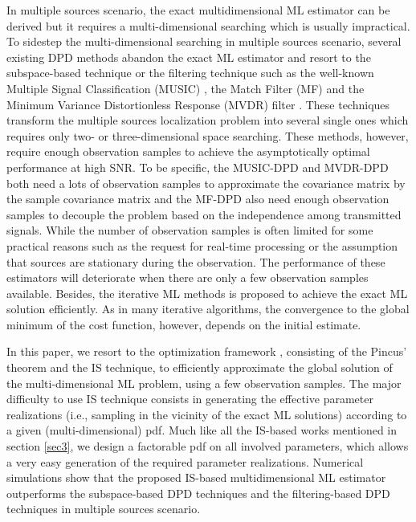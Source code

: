 \documentclass[review]{elsarticle}
\begin{document}
In multiple sources scenario, the exact multidimensional ML estimator can be derived but it requires a multi-dimensional searching which is usually impractical. To sidestep the multi-dimensional searching in multiple sources scenario, several existing DPD methods abandon the exact ML estimator and resort to the subspace-based technique or the filtering technique such as the well-known Multiple Signal Classification (MUSIC) \cite{DPD2005}, the Match Filter (MF) \cite{2004Direct} and the Minimum Variance Distortionless Response (MVDR) filter \cite{Tirer2015High}. These techniques transform the multiple sources localization problem into several single ones which requires only two- or three-dimensional space searching. 
These methods, however, require enough observation samples to achieve the asymptotically optimal performance at high SNR. To be specific, the MUSIC-DPD \cite{DPD2005} and MVDR-DPD \cite{Tirer2015High} both need a lots of observation samples to approximate the covariance matrix by the sample covariance matrix and the MF-DPD \cite{2004Direct} also need enough observation samples to decouple the problem based on the independence among transmitted signals. While the number of observation samples is often limited for some practical reasons such as the request for real-time processing or the assumption that sources are stationary during the observation. The performance of these estimators will deteriorate when there are only a few observation samples available. Besides, the iterative ML methods \cite{2006Efficient} is proposed to achieve the exact ML solution efficiently. As in many iterative algorithms, the convergence to the global minimum of the cost function, however, depends on the initial estimate.

In this paper, we resort to the optimization framework \cite{Kay2000Mean}, consisting of the Pincus' theorem \cite{Pincus1968A} and the IS technique, to efficiently approximate the global solution of the multi-dimensional ML problem, using a few observation samples. The major difficulty to use IS technique consists in generating the effective parameter realizations (i.e., sampling in the vicinity of the exact ML solutions) according to a given (multi-dimensional) pdf. Much like all the IS-based works mentioned in section \ref{sec3}, we design a factorable pdf on all involved parameters, which allows a very easy generation of the required parameter realizations. Numerical simulations show that the proposed IS-based multidimensional ML estimator outperforms the subspace-based DPD techniques and the filtering-based DPD techniques in multiple sources scenario.
\end{document}
